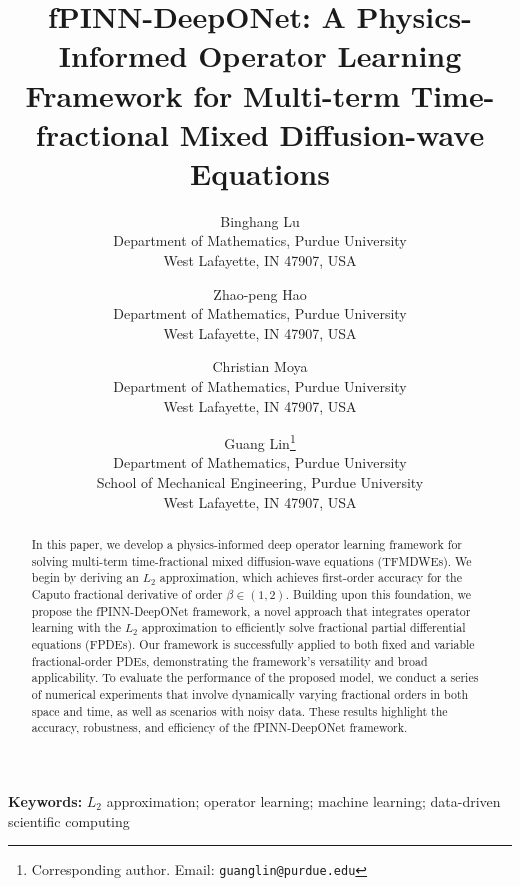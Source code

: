 \documentclass[11pt]{article}
\title{fPINN-DeepONet: A Physics-Informed Operator Learning Framework for Multi-term Time-fractional Mixed Diffusion-wave Equations}
\author{
Binghang Lu\\
\small Department of Mathematics, Purdue University\\
\small West Lafayette, IN 47907, USA
\and
Zhao-peng Hao\\
\small Department of Mathematics, Purdue University\\
\small West Lafayette, IN 47907, USA
\and
Christian Moya\\
\small Department of Mathematics, Purdue University\\
\small West Lafayette, IN 47907, USA
\and
Guang Lin\thanks{Corresponding author. Email: \texttt{guanglin@purdue.edu}}\\
\small Department of Mathematics, Purdue University\\
\small School of Mechanical Engineering, Purdue University\\
\small West Lafayette, IN 47907, USA
}
\date{}
\begin{document}
\maketitle

\begin{abstract}
In this paper, we develop a physics-informed deep operator learning framework for solving multi-term time-fractional mixed diffusion-wave equations (TFMDWEs). We begin by deriving an $L_2$ approximation, which achieves first-order accuracy for the Caputo fractional derivative of order $\beta \in (1,2)$. Building upon this foundation, we propose the fPINN-DeepONet framework, a novel approach that integrates operator learning with the $L_2$ approximation to efficiently solve fractional partial differential equations (FPDEs). Our framework is successfully applied to both fixed and variable fractional-order PDEs, demonstrating the framework's versatility and broad applicability. To evaluate the performance of the proposed model, we conduct a series of numerical experiments that involve dynamically varying fractional orders in both space and time, as well as scenarios with noisy data. These results highlight the accuracy, robustness, and efficiency of the fPINN-DeepONet framework.
\end{abstract}

\noindent\textbf{Keywords:} $L_2$ approximation; operator learning; machine learning; data-driven scientific computing
\end{document}
